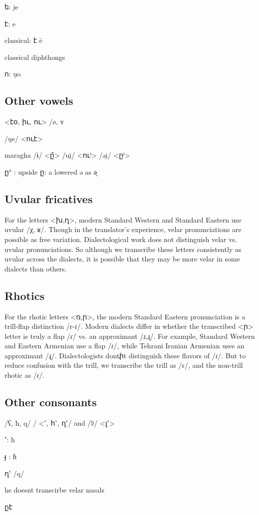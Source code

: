 ե: i̯e

է: e

classical: է ē

classical diphthongs

ո: u̯o

\subsection{Other vowels}

<էօ, իւ, ու> /ø, ʏ

 /u̯e/ <ուէ>

maragha
 /ɨ/ <ը̂>  
/ui̯/ <ուⁱ>
/əi̯/ <ըⁱ>  


ը° : upside ը: a lowered ə as ə̞
\subsection{Uvular fricatives}
For the letters <խ,ղ>, modern Standard Western and Standard Eastern use uvular /χ, ʁ/. Though in the translator's experience, velar pronunciations are possible as free variation. Dialectological work does not distinguish velar vs. uvular pronunciations. So although we transcribe these letters consistently as uvular across the dialects, it is possible that they may be more velar in some dialects than others. 

\subsection{Rhotics}
For the rhotic letters <ռ,ր>, the modern Standard Eastern pronunciation is a trill-flap distinction /r-ɾ/. Modern dialects differ in whether the transcribed <ր>  letter is truly a flap /ɾ/ vs. an approximant /ɹ,ɻ/. For example, Standard Western and Eastern Armenian use a flap /ɾ/, while Tehrani Iranian Armenian uses an approximant /ɻ/.  Dialectologists donփt distinguish these flavors of /ɾ/. But to reduce confusion with the trill, we transcribe the trill as /r/, and the non-trill rhotic as /ɾ/. 

\subsection{Other consonants}
/ʕ, ħ, q/ /   <ՙ, հՙ, ղՙ/   and /lʲ/  <լՙ> 

՚: ħ  

յ̵   : ɦ

ղՙ /q/

he doesnt transcirbe velar nasals

ըէ

